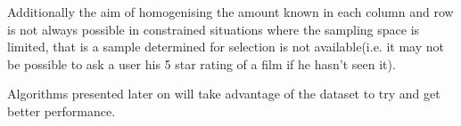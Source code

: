 Additionally the aim of homogenising the amount known in each column and row is not always possible in constrained situations where the sampling space is limited, that is a sample determined for selection is not available(i.e. it may not be possible to ask a user his 5 star rating of a film if he hasn't seen it).

Algorithms presented later on will take advantage of the dataset to try and get better performance.


